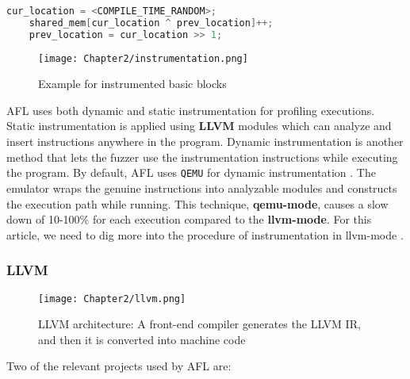 \begin{lstlisting}[language=C++,style=CodeStyle,label={lst:hash},caption={Select element and update in shared\_mem}]
    cur_location = <COMPILE_TIME_RANDOM>;
    shared_mem[cur_location ^ prev_location]++; 
    prev_location = cur_location >> 1;
\end{lstlisting}

\begin{figure}[htpb]
    \texttt{[image: Chapter2/instrumentation.png]}
    \centering
    \captionsetup{justification=centering}
    \caption{Example for instrumented basic blocks}
    \label{fig:instrumentation}
\end{figure}

AFL uses both dynamic and static instrumentation for profiling executions. Static instrumentation is applied using \textbf{LLVM} modules which can analyze and insert instructions anywhere in the program. Dynamic instrumentation is another method that lets the fuzzer use the instrumentation instructions while executing the program. By default, AFL uses \texttt{QEMU} for dynamic instrumentation \cite{afl_qemu}. The emulator wraps the genuine instructions into analyzable modules and constructs the execution path while running. This technique, \textbf{qemu-mode}, causes a slow down of 10-100\% for each execution compared to the \textbf{llvm-mode}. For this article, we need to dig more into the procedure of instrumentation in llvm-mode \cite{afl-llvm}.

\subsubsection{LLVM}
\label{subsub:llvm}

\begin{figure}[!b]
    \texttt{[image: Chapter2/llvm.png]}
    \centering
    \captionsetup{justification=centering}
    \caption{LLVM architecture: A front-end compiler generates the LLVM IR, and then it is converted into machine code \cite{omni_sci}}
    \label{fig:llvm}
\end{figure}

 \cite{llvm} Two of the relevant projects used by AFL are:

